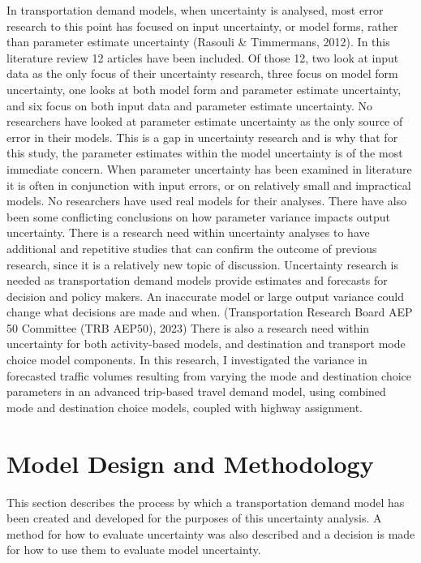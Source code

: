\documentclass[fancy, masters, twoside]{byuthesis}
\begin{document}
In transportation demand models, when uncertainty is analysed, most error research to this point has focused on input uncertainty, or model forms, rather than parameter estimate uncertainty (Rasouli \& Timmermans, 2012). In this literature review 12 articles have been included. Of those 12, two look at input data as the only focus of their uncertainty research, three focus on model form uncertainty, one looks at both model form and parameter estimate uncertainty, and six focus on both input data and parameter estimate uncertainty. No researchers have looked at parameter estimate uncertainty as the only source of error in their models. This is a gap in uncertainty research and is why that for this study, the parameter estimates within the model uncertainty is of the most immediate concern. When parameter uncertainty has been examined in literature it is often in conjunction with input errors, or on relatively small and impractical models. No researchers have used real models for their analyses. There have also been some conflicting conclusions on how parameter variance impacts output uncertainty. There is a research need within uncertainty analyses to have additional and repetitive studies that can confirm the outcome of previous research, since it is a relatively new topic of discussion. Uncertainty research is needed as transportation demand models provide estimates and forecasts for decision and policy makers. An inaccurate model or large output variance could change what decisions are made and when. (Transportation Research Board AEP 50 Committee (TRB AEP50), 2023) There is also a research need within uncertainty for both activity-based models, and destination and transport mode choice model components. In this research, I investigated the variance in forecasted traffic volumes resulting from varying the mode and destination choice parameters in an advanced trip-based travel demand model, using combined mode and destination choice models, coupled with highway assignment.

\hypertarget{model-design-and-methodology}{%
\chapter{Model Design and Methodology}\label{model-design-and-methodology}}

This section describes the process by which a transportation demand model has been created and developed for the purposes of this uncertainty analysis. A method for how to evaluate uncertainty was also described and a decision is made for how to use them to evaluate model uncertainty.
\end{document}
